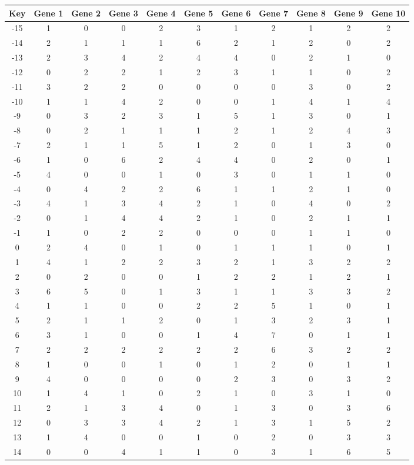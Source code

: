 \begin{tabular}{|c|c|c|c|c|c|c|c|c|c|c|}
\hline
Key & Gene 1 & Gene 2 & Gene 3 & Gene 4 & Gene 5 & Gene 6 & Gene 7 & Gene 8 & Gene 9 & Gene 10 \\
\hline
-15 & 1 & 0 & 0 & 2 & 3 & 1 & 2 & 1 & 2 & 2 \\
-14 & 2 & 1 & 1 & 1 & 6 & 2 & 1 & 2 & 0 & 2 \\
-13 & 2 & 3 & 4 & 2 & 4 & 4 & 0 & 2 & 1 & 0 \\
-12 & 0 & 2 & 2 & 1 & 2 & 3 & 1 & 1 & 0 & 2 \\
-11 & 3 & 2 & 2 & 0 & 0 & 0 & 0 & 3 & 0 & 2 \\
-10 & 1 & 1 & 4 & 2 & 0 & 0 & 1 & 4 & 1 & 4 \\
-9 & 0 & 3 & 2 & 3 & 1 & 5 & 1 & 3 & 0 & 1 \\
-8 & 0 & 2 & 1 & 1 & 1 & 2 & 1 & 2 & 4 & 3 \\
-7 & 2 & 1 & 1 & 5 & 1 & 2 & 0 & 1 & 3 & 0 \\
-6 & 1 & 0 & 6 & 2 & 4 & 4 & 0 & 2 & 0 & 1 \\
-5 & 4 & 0 & 0 & 1 & 0 & 3 & 0 & 1 & 1 & 0 \\
-4 & 0 & 4 & 2 & 2 & 6 & 1 & 1 & 2 & 1 & 0 \\
-3 & 4 & 1 & 3 & 4 & 2 & 1 & 0 & 4 & 0 & 2 \\
-2 & 0 & 1 & 4 & 4 & 2 & 1 & 0 & 2 & 1 & 1 \\
-1 & 1 & 0 & 2 & 2 & 0 & 0 & 0 & 1 & 1 & 0 \\
0 & 2 & 4 & 0 & 1 & 0 & 1 & 1 & 1 & 0 & 1 \\
1 & 4 & 1 & 2 & 2 & 3 & 2 & 1 & 3 & 2 & 2 \\
2 & 0 & 2 & 0 & 0 & 1 & 2 & 2 & 1 & 2 & 1 \\
3 & 6 & 5 & 0 & 1 & 3 & 1 & 1 & 3 & 3 & 2 \\
4 & 1 & 1 & 0 & 0 & 2 & 2 & 5 & 1 & 0 & 1 \\
5 & 2 & 1 & 1 & 2 & 0 & 1 & 3 & 2 & 3 & 1 \\
6 & 3 & 1 & 0 & 0 & 1 & 4 & 7 & 0 & 1 & 1 \\
7 & 2 & 2 & 2 & 2 & 2 & 2 & 6 & 3 & 2 & 2 \\
8 & 1 & 0 & 0 & 1 & 0 & 1 & 2 & 0 & 1 & 1 \\
9 & 4 & 0 & 0 & 0 & 0 & 2 & 3 & 0 & 3 & 2 \\
10 & 1 & 4 & 1 & 0 & 2 & 1 & 0 & 3 & 1 & 0 \\
11 & 2 & 1 & 3 & 4 & 0 & 1 & 3 & 0 & 3 & 6 \\
12 & 0 & 3 & 3 & 4 & 2 & 1 & 3 & 1 & 5 & 2 \\
13 & 1 & 4 & 0 & 0 & 1 & 0 & 2 & 0 & 3 & 3 \\
14 & 0 & 0 & 4 & 1 & 1 & 0 & 3 & 1 & 6 & 5 \\
\hline
\end{tabular}